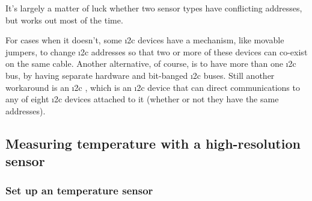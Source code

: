 It's largely a matter of luck whether two sensor types have conflicting addresses, but works out most of the time.

For cases when it doesn't, some \i2c devices have a mechanism, like movable jumpers, to change \i2c addresses so that two or more of these devices can co-exist on the same cable.
Another alternative, of course, is to have more than one \i2c bus, \eg by having separate hardware and bit-banged \i2c buses.
Still another workaround is an \i2c , which is an \i2c device that can direct communications to any of eight \i2c devices attached to it (whether or  not they have the same addresses).

\subsection{\color{gray} Measuring temperature with a high-resolution sensor \color{black}}

\subsubsection{\howto Set up an  temperature sensor}

